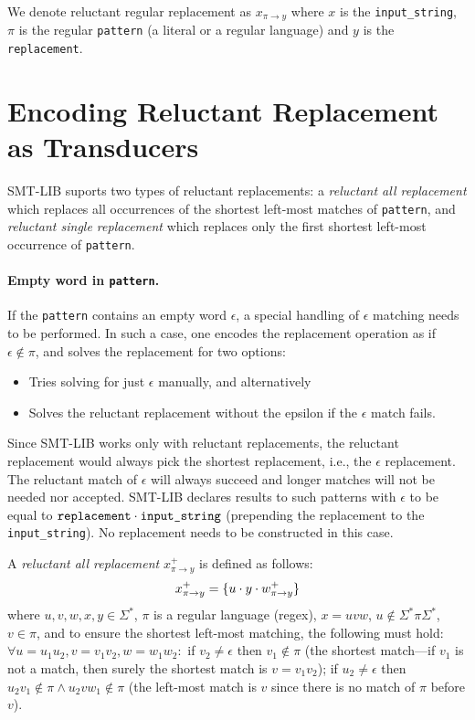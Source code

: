 We denote reluctant regular replacement as $x_{\pi \rightarrow y}$ where $x$ is the \texttt{input\_string}, $\pi$ is the regular \texttt{pattern} (a literal or a regular language) and $y$ is the \texttt{replacement}.

\section{Encoding Reluctant Replacement as Transducers}

SMT-LIB suports two types of reluctant replacements: a \emph{reluctant all replacement} which replaces all occurrences of the shortest left-most matches of \texttt{pattern}, and \emph{reluctant single replacement} which replaces only the first shortest left-most occurrence of \texttt{pattern}.

\paragraph{Empty word in \texttt{pattern}.}
If the \texttt{pattern} contains an empty word $\epsilon$, a special handling of $\epsilon$ matching needs to be performed. In such a case, one encodes the replacement operation as if $\epsilon \notin \pi$, and solves the replacement for two options:
\begin{itemize}
  \item Tries solving for just $\epsilon$ manually, and alternatively
  \item Solves the reluctant replacement without the epsilon if the $\epsilon$ match fails.
\end{itemize}
Since SMT-LIB works only with reluctant replacements, the reluctant replacement would always pick the shortest replacement, i.e., the $\epsilon$ replacement. The reluctant match of $\epsilon$ will always succeed and longer matches will not be needed nor accepted. SMT-LIB declares results to such patterns with $\epsilon$ to be equal to $\texttt{replacement} \cdot \texttt{input\_string}$ (prepending the replacement to the \texttt{input\_string}).
No replacement \nft needs to be constructed in this case.


\begin{definition} \hfill \newline
  A \emph{reluctant all replacement} $x^{+}_{\pi \rightarrow y}$ is defined as follows: \newline
  $$x^{+}_{\pi \rightarrow y} = \{ u \cdot y \cdot w^{+}_{\pi \rightarrow y} \}$$
  where $u, v, w, x, y \in \Sigma^*$, $\pi$ is a regular language (regex), $x = u v w$, $u \notin \Sigma^* \pi \Sigma^*$, $v \in \pi$, and to ensure the shortest left-most matching, the following must hold: $\forall u = u_1 u_2, v = v_1 v_2, w = w_1 w_2:$ if $v_2 \neq \epsilon$ then $v_1 \notin \pi$ (the shortest match---if $v_1$ is not a match, then surely the shortest match is $v = v_1v_2$);
  if $u_2 \neq \epsilon$ then $u_2 v_1 \notin \pi \land u_2 v w_1 \notin \pi$ (the left-most match is $v$ since there is no match of $\pi$ before $v$).
\end{definition}


